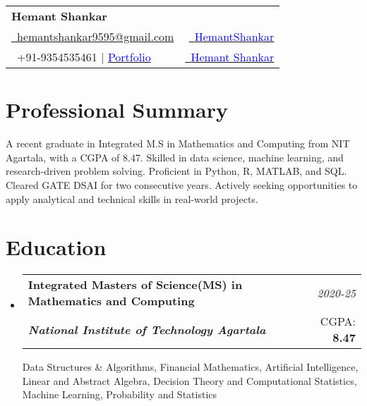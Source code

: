 \documentclass[a4paper,11pt]{article}
\makeatletter
\newcommand{\resumeSubheading}[4]{
\vspace{0.5mm}\item
    \begin{tabular*}{0.98\textwidth}[t]{l@{\extracolsep{\fill}}r}
        \textbf{#1} & \textit{\footnotesize{#4}} \\
        \textit{\footnotesize{#3}} &  \footnotesize{#2}\\
    \end{tabular*}
    \vspace{-2.4mm}
}
\newcommand{\resumeSubHeadingListStart}{\begin{itemize}[leftmargin=*,labelsep=0mm]}
\newcommand{\resumeSubHeadingListEnd}{\end{itemize}\vspace{2mm}}
\newcommand{\name}{Hemant Shankar} %
\newcommand{\phone}{9354535461 | \href{https://hemant-shankar-portfolio.onrender.com/}{\textcolor{blue}{Portfolio}}} %
\newcommand{\emaila}{hemantshankar9595@gmail.com} %
\makeatother
\begin{document}
\selectfont

{
\begin{tabularx}{\linewidth}{L r} \\
  \textbf{\Large \name}\\
  \href{mailto:hemantshankar9595@gmail.com}{\raisebox{0.0\height}{\footnotesize \faEnvelope}\ {\emaila}} & \href{https://github.com/HemantShankar}{\raisebox{0.0\height}{\footnotesize \faGithub}\ {\textcolor{blue}{HemantShankar}}} \\  
  {\raisebox{0.0\height}{\footnotesize \faPhone}\ +91-\phone} & \href{https://www.linkedin.com/in/hemant-shankar}{\raisebox{0.0\height}{\footnotesize \faLinkedin}\ {\textcolor{blue}{Hemant Shankar}}}
\end{tabularx}
}

\vspace{-4mm}
\section{\textbf{Professional Summary}}
\small{
A recent graduate in Integrated M.S in Mathematics and Computing from NIT Agartala, with a CGPA of 8.47. Skilled in data science, machine learning, and research-driven problem solving. Proficient in Python, R, MATLAB, and SQL. Cleared GATE DSAI for two consecutive years. Actively seeking opportunities to apply analytical and technical skills in real-world projects.
}
\vspace{-2mm}
\section{\textbf{Education}}
  \resumeSubHeadingListStart
    \resumeSubheading
      { Integrated Masters of Science(MS) in Mathematics and Computing}{CGPA: \textbf{8.47}}
      {\textbf{National Institute of Technology Agartala}}{2020-25}
      \vspace{0.3cm}
      \small Data Structures \& Algorithms, Financial Mathematics, Artificial Intelligence, Linear and
Abstract Algebra, Decision Theory and
Computational Statistics, Machine Learning, 
Probability and Statistics
  \resumeSubHeadingListEnd
\vspace{-6.5mm}
%


\end{document}
